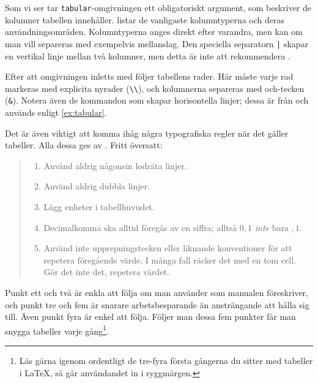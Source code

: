 \documentclass[lang=sv,ptsize=10pt,font=none,nomath,titles=bf,../../a4.tex]{subfiles}
\begin{document}
Som vi ser tar \texttt{tabular}-omgivningen ett obligatoriskt argument,
som beskriver de kolumner tabellen innehåller. 
listar de vanligaste kolumntyperna och deras användningsområden.
Kolumntyperna anges direkt efter varandra, men kan om man vill separeras
med exempelvis mellanslag. Den speciella separatorn \texttt{|} skapar en
vertikal linje mellan två kolumner, men detta är inte att rekommendera
\parencite{Fear05}.

Efter att omgivningen inletts med  följer tabellens rader. Här
måste varje rad markeras med explicita nyrader (\verb|\\|), och kolumnerna
separeras med och-tecken (\verb|&|). Notera även de kommandon som skapar
horisontella linjer; dessa är från  och används enligt
\cref{ex:tabular}.

Det är även viktigt att komma ihåg några typografiska regler när det
gäller tabeller. Alla dessa ges av \textcite[3]{Fear05}. Fritt
översatt:

\begin{quotation}
	\begin{enumerate}
		\item Använd aldrig någonsin lodräta linjer.
		\item Använd aldrig dubbla linjer.
		\item Lägg enheter i tabellhuvudet.
		\item Decimalkomma ska alltid föregås av en siffra; alltså \(0,1\) 
		\emph{inte} bara \(,1\).
		\item Använd inte upprepningstecken eller liknande konventioner 
		för att repetera föregående värde. I många fall räcker det med en 
		tom cell. Gör det inte det, repetera värdet.
	\end{enumerate}
\end{quotation}

Punkt ett och två är enkla att följa om man använder  som
manualen föreskriver, och punkt tre och fem är snarare arbetsbesparande än
ansträngande att hålla sig till. Även punkt fyra är enkel att följa. 
Följer man
dessa fem punkter får man snygga tabeller varje gång\footnote{Läs gärna
igenom \textcite{Fear05} ordentligt de tre-fyra första gångerna du
sitter med tabeller i \LaTeX, så går användandet in i ryggmärgen.}.
\end{document}
